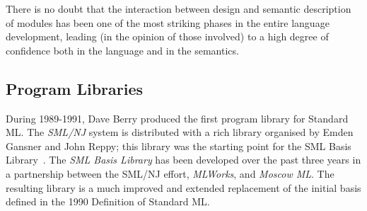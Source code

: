 There is no doubt that the interaction between design and semantic description
of modules has been one of the most striking phases in the entire language
development, leading (in the opinion of those involved) to a high degree of
confidence both in the language and in the semantics.


\subsection*{Program Libraries}
 During 1989-1991, Dave Berry produced the first program library for
 Standard ML\cite{mllib91,berry93}.
 The {\em SML/NJ} system is distributed with a rich library organised by
 Emden Gansner and John Reppy; this library was the starting point for
 the SML Basis Library~.
 The {\em SML Basis Library\/}\cite{sml-basis-lib} has been developed 
 over the past three years in a
 partnership between the SML/NJ effort, {\em MLWorks}, and {\em Moscow ML}.
 The resulting library is a much improved and extended 
 replacement of the initial basis defined in the 1990 Definition of 
 Standard ML.

